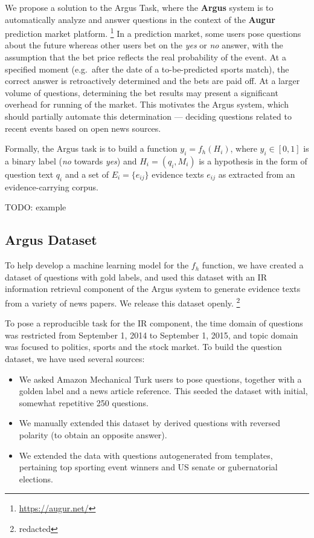 \documentclass[11pt]{article}
\begin{document}
We propose a solution to the Argus Task, where
the \textbf{Argus} system \cite{arguswp} \cite{argus}
is to automatically analyze and answer questions
in the context of the \textbf{Augur} prediction market platform.%
\footnote{\url{https://augur.net/}}
In a prediction market, some users pose questions about the future
whereas other users bet on the \textit{yes} or \textit{no} answer,
with the assumption that the bet price reflects the real probability
of the event.  At a specified moment (e.g.\ after the date of a to-be-predicted sports match), the
correct answer is retroactively determined and the bets are paid off.
At a larger volume of questions, determining the bet results may
present a significant overhead for running of the market.
This motivates the Argus system, which should partially automate
this determination --- deciding questions related to recent events
based on open news sources.

Formally, the Argus task is to build a function $y_i = f_h(H_i)$,
where $y_i \in [0,1]$ is a binary label (\textit{no} towards \textit{yes})
and $H_i = (q_i, M_i)$ is a hypothesis in the form of question text $q_i$
and a set of $E_i = \{e_{ij}\}$ evidence texts $e_{ij}$ as extracted
from an evidence-carrying corpus.

TODO: example


\subsection{Argus Dataset}

To help develop a machine learning model for the $f_h$ function,
we have created a dataset of questions with gold labels, and used
this dataset with an IR information retrieval component of the Argus
system to generate evidence texts from a variety of news papers.
We release this dataset openly.%
\footnote{redacted}

To pose a reproducible task for the IR component, the time domain
of questions was restricted from September 1, 2014 to September 1, 2015,
and topic domain was focused to politics, sports and the stock market.
To build the question dataset, we have used several sources:
\begin{itemize}
	\item We asked Amazon Mechanical Turk users to pose questions, together with a golden label and a news article reference.
		This seeded the dataset with initial, somewhat repetitive 250 questions.
	\item We manually extended this dataset by derived questions with reversed polarity (to obtain an opposite answer).
	\item We extended the data with questions autogenerated from templates, pertaining top sporting event winners and US senate or gubernatorial elections.
\end{itemize}
\end{document}
